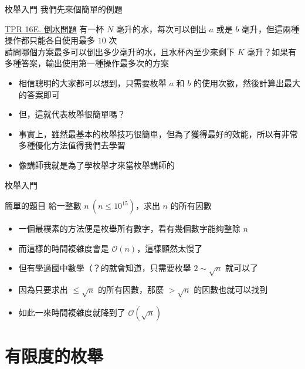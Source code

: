 \documentclass[aspectratio=169]{beamer}
\begin{document}
    \begin{frame}{枚舉入門}
        我們先來個簡單的例題
        \begin{block}{\href{https://codeforces.com/group/H0qY3QmnOW/contest/366708/problem/E}{TPR 16E. 倒水問題}}
            有一杯 $N$ 毫升的水，每次可以倒出 $a$ 或是 $b$ 毫升，但這兩種操作都只能各自使用最多 $10$ 次 \\
            請問哪個方案最多可以倒出多少毫升的水，且水杯內至少來剩下 $K$ 毫升？如果有多種答案，輸出使用第一種操作最多次的方案
        \end{block}

        \begin{itemize}
            \item<1-> 相信聰明的大家都可以想到，只需要枚舉 $a$ 和 $b$ 的使用次數，然後計算出最大的答案即可
            \item<2-> 但，這就代表枚舉很簡單嗎？
            \item<3-> 事實上，雖然最基本的枚舉技巧很簡單，但為了獲得最好的效能，所以有非常多種優化方法值得我們去學習
            \item<4-> 像講師我就是為了學枚舉才來當枚舉講師的
        \end{itemize}
    \end{frame}

    \begin{frame}{枚舉入門}
        \begin{block}{簡單的題目}
            給一整數 $n\ (n \le 10^{15})$，求出 $n$ 的所有因數
        \end{block}

        \begin{itemize}
            \item<1-> 一個最樸素的方法便是枚舉所有數字，看有幾個數字能夠整除 $n$
            \item<1-> 而這樣的時間複雜度會是 $\mathcal{O}(n)$，這樣顯然太慢了
            \item<2-> 但有學過國中數學（？的就會知道，只需要枚舉 $2 \sim \sqrt{n}$ 就可以了
            \item<2-> 因為只要求出 $\le \sqrt{n}$ 的所有因數，那麼 $> \sqrt{n}$ 的因數也就可以找到
            \item<3-> 如此一來時間複雜度就降到了 $\mathcal{O}(\sqrt{n})$
        \end{itemize}
    \end{frame}

    \section{有限度的枚舉}
\end{document}
